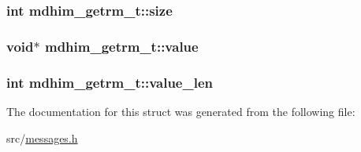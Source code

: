 \hypertarget{structmdhim__getrm__t_a850957632986ef7c1f352de7e126d6a4}{
\subsubsection[{size}]{\setlength{\rightskip}{0pt plus 5cm}int mdhim\-\_\-getrm\-\_\-t\-::size}}\label{d5/dfb/structmdhim__getrm__t_a850957632986ef7c1f352de7e126d6a4}
\hypertarget{structmdhim__getrm__t_ae1e2ce047de1164dcdb1bcfe0f6fd0ae}{
\subsubsection[{value}]{\setlength{\rightskip}{0pt plus 5cm}void$\ast$ mdhim\-\_\-getrm\-\_\-t\-::value}}\label{d5/dfb/structmdhim__getrm__t_ae1e2ce047de1164dcdb1bcfe0f6fd0ae}
\hypertarget{structmdhim__getrm__t_af5959ca99312966ae31a7ffec962d9ea}{
\subsubsection[{value\-\_\-len}]{\setlength{\rightskip}{0pt plus 5cm}int mdhim\-\_\-getrm\-\_\-t\-::value\-\_\-len}}\label{d5/dfb/structmdhim__getrm__t_af5959ca99312966ae31a7ffec962d9ea}


The documentation for this struct was generated from the following file\-:\begin{DoxyCompactItemize}
\item 
src/\hyperlink{messages_8h}{messages.\-h}\end{DoxyCompactItemize}
